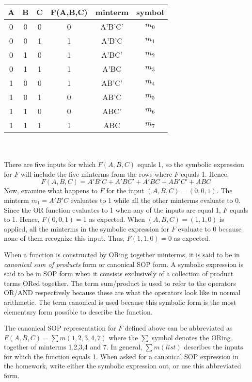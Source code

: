 \begin{tabular}{c|c|c||c|c|c}
A & B & C & F(A,B,C)	& minterm & symbol	\\ \hline
0 & 0 & 0 & 0		& A'B'C'  & $m_0$	\\ \hline
0 & 0 & 1 & 1		& A'B'C   & $m_1$	\\ \hline
0 & 1 & 0 & 1		& A'BC'   & $m_2$	\\ \hline
0 & 1 & 1 & 1		& A'BC    & $m_3$	\\ \hline
1 & 0 & 0 & 1		& AB'C'   & $m_4$	\\ \hline
1 & 0 & 1 & 0		& AB'C    & $m_5$	\\ \hline
1 & 1 & 0 & 0		& ABC'    & $m_6$	\\ \hline
1 & 1 & 1 & 1		& ABC     & $m_7$	\\ 
\end{tabular}
\\ \\
There are five inputs for which $F(A,B,C)$ equals 1, so the symbolic
expression for $F$ will include the five minterms from the rows where
$F$ equals 1.  Hence, 
$$F(A,B,C) =  A'B'C + A'BC' + A'BC + AB'C' + ABC$$
Now, examine what happens to $F$ for the input $(A,B,C)=(0,0,1)$.  
The minterm $m_1=A'B'C$ evaluates to 1 while all the other minterms 
evaluate to 0.  Since the OR function evaluates to 1 when any of 
the inputs are equal 1, $F$ equals to 1. Hence, $F(0,0,1)=1$ as
expected.  When $(A,B,C)=(1,1,0)$ is applied, all the
minterms in the symbolic expression for $F$ evaluate to 0 because
none of them recognize this input.  Thus, $F(1,1,0)=0$ as expected.

When a function is constructed by ORing together minterms, it is
said to be in \textit{canonical sum of products} 
 form or canonical SOP form.  A symbolic
expression is said to be in SOP form when it consists
exclusively of a collection of product terms ORed together.  
The term sum/product is used to refer to the operators OR/AND 
respectively because these are what the operators look like in 
normal arithmetic. The term canonical is used because this 
symbolic form is the most elementary form possible to describe 
the function.

The canonical SOP representation for $F$ defined above can be 
abbreviated as $F(A,B,C) = \sum m(1,2,3,4,7)$  where the $\sum$
symbol denotes the ORing together of minterms 1,2,3,4 and 7.
In general, $\sum m(list)$ describes the inputs for which the
function equals 1.  When asked for a canonical SOP expression
in the homework, write either the symbolic expression
out, or use this abbreviated form.

